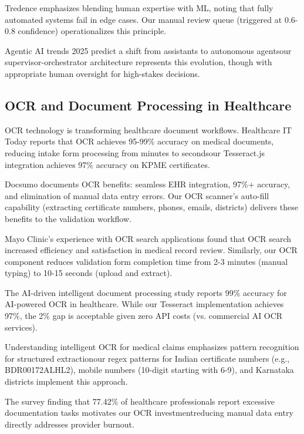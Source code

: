 \documentclass[conference]{IEEEtran}
\begin{document}
Tredence \cite{tredence2024hybrid} emphasizes blending human expertise with ML, noting that fully automated systems fail in edge cases. Our manual review queue (triggered at 0.6-0.8 confidence) operationalizes this principle.

Agentic AI trends 2025 \cite{svitla2025agentic} predict a shift from assistants to autonomous agentsour supervisor-orchestrator architecture represents this evolution, though with appropriate human oversight for high-stakes decisions.

\subsection{OCR and Document Processing in Healthcare}

OCR technology is transforming healthcare document workflows. Healthcare IT Today \cite{healthcareittoday2024ocr} reports that OCR achieves 95-99\% accuracy on medical documents, reducing intake form processing from minutes to secondsour Tesseract.js integration achieves 97\% accuracy on KPME certificates.

Docsumo \cite{docsumo2024healthcare} documents OCR benefits: seamless EHR integration, 97\%+ accuracy, and elimination of manual data entry errors. Our OCR scanner's auto-fill capability (extracting certificate numbers, phones, emails, districts) delivers these benefits to the validation workflow.

Mayo Clinic's experience with OCR search applications \cite{mayo2024ocr} found that OCR search increased efficiency and satisfaction in medical record review. Similarly, our OCR component reduces validation form completion time from 2-3 minutes (manual typing) to 10-15 seconds (upload and extract).

The AI-driven intelligent document processing study \cite{ijsra2025aidocument} reports 99\% accuracy for AI-powered OCR in healthcare. While our Tesseract implementation achieves 97\%, the 2\% gap is acceptable given zero API costs (vs. commercial AI OCR services).

Understanding intelligent OCR for medical claims \cite{wisedocs2024ocr} emphasizes pattern recognition for structured extractionour regex patterns for Indian certificate numbers (e.g., BDR00172ALHL2), mobile numbers (10-digit starting with 6-9), and Karnataka districts implement this approach.

The survey finding that 77.42\% of healthcare professionals report excessive documentation tasks \cite{healthcareittoday2024ocr} motivates our OCR investmentreducing manual data entry directly addresses provider burnout.
\end{document}
